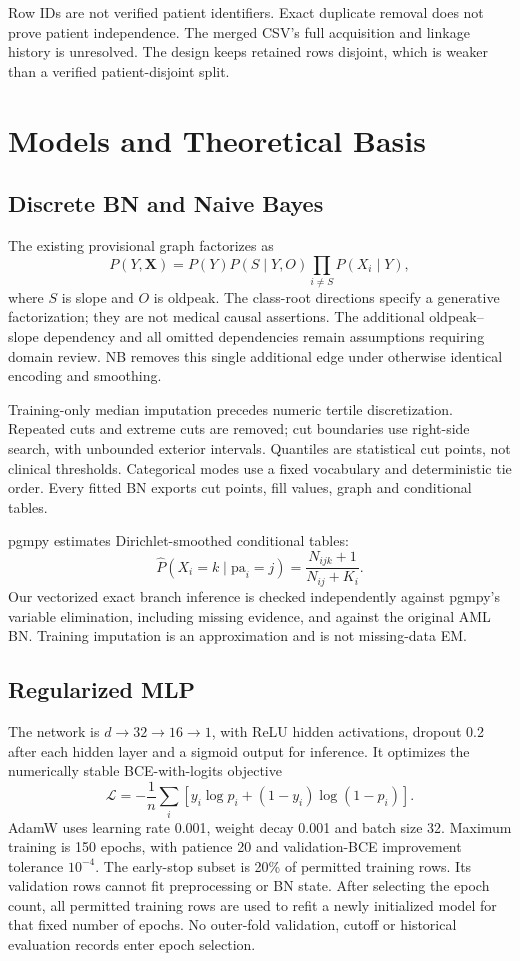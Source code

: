 \documentclass[conference]{IEEEtran}
\begin{document}
Row IDs are not verified patient identifiers. Exact duplicate removal does not prove patient independence. The merged CSV's full acquisition and linkage history is unresolved. The design keeps retained rows disjoint, which is weaker than a verified patient-disjoint split.
\section{Models and Theoretical Basis}
\subsection{Discrete BN and Naive Bayes}
The existing provisional graph factorizes as
\begin{equation}
P(Y,\mathbf X)=P(Y)P(S\mid Y,O)\prod_{i\ne S}P(X_i\mid Y),
\end{equation}
where $S$ is slope and $O$ is oldpeak. The class-root directions specify a generative factorization; they are not medical causal assertions. The additional oldpeak--slope dependency and all omitted dependencies remain assumptions requiring domain review. NB removes this single additional edge under otherwise identical encoding and smoothing.

Training-only median imputation precedes numeric tertile discretization. Repeated cuts and extreme cuts are removed; cut boundaries use right-side search, with unbounded exterior intervals. Quantiles are statistical cut points, not clinical thresholds. Categorical modes use a fixed vocabulary and deterministic tie order. Every fitted BN exports cut points, fill values, graph and conditional tables.

pgmpy estimates Dirichlet-smoothed conditional tables:
\begin{equation}
\widehat P(X_i=k\mid \mathrm{pa}_i=j)=\frac{N_{ijk}+1}{N_{ij}+K_i}.
\end{equation}
Our vectorized exact branch inference is checked independently against pgmpy's variable elimination, including missing evidence, and against the original AML BN. Training imputation is an approximation and is not missing-data EM.
\subsection{Regularized MLP}
The network is $d\rightarrow32\rightarrow16\rightarrow1$, with ReLU hidden activations, dropout 0.2 after each hidden layer and a sigmoid output for inference. It optimizes the numerically stable BCE-with-logits objective
\begin{equation}
\mathcal L=-\frac{1}{n}\sum_i[y_i\log p_i+(1-y_i)\log(1-p_i)].
\end{equation}
AdamW uses learning rate 0.001, weight decay 0.001 and batch size 32. Maximum training is 150 epochs, with patience 20 and validation-BCE improvement tolerance $10^{-4}$. The early-stop subset is 20\% of permitted training rows. Its validation rows cannot fit preprocessing or BN state. After selecting the epoch count, all permitted training rows are used to refit a newly initialized model for that fixed number of epochs. No outer-fold validation, cutoff or historical evaluation records enter epoch selection.
\end{document}
